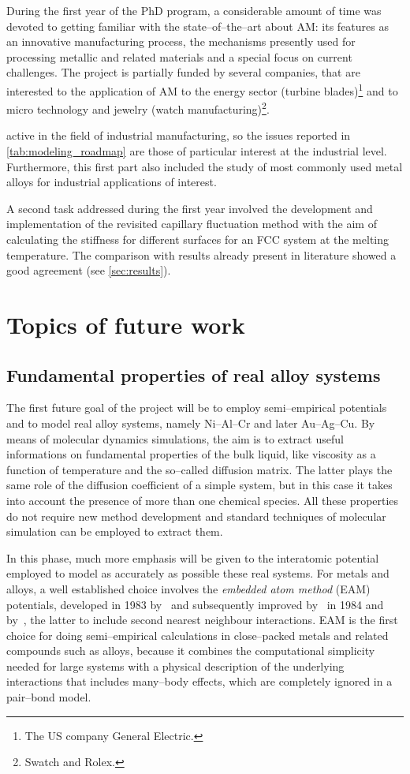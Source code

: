 During the first year of the PhD program, a considerable amount of time was devoted to getting familiar with the state--of--the--art about AM: its features as an innovative manufacturing process, the mechanisms presently used for processing metallic and related materials and a special focus on current challenges. The project is partially funded by several companies, that are interested to the application of AM to the energy sector (turbine blades)\footnote{The US company General Electric.} and to micro technology and jewelry (watch manufacturing)\footnote{Swatch and Rolex.}.

active in the field of industrial manufacturing, so the issues reported in \cref{tab:modeling_roadmap} are those of particular interest at the industrial level. Furthermore, this first part also included the study of most commonly used metal alloys for industrial applications of interest. 

A second task addressed during the first year involved the development and implementation of the revisited capillary fluctuation method with the aim of calculating the stiffness for different surfaces for an FCC system at the melting temperature. The comparison with results already present in literature showed a good agreement (see \cref{sec:results}).



\section{Topics of future work}

\subsection{Fundamental properties of real alloy systems}
The first future goal of the project will be to employ semi--empirical potentials and to model real alloy systems, namely Ni--Al--Cr and later Au--Ag--Cu. By means of molecular dynamics simulations, the aim is to extract useful informations on fundamental properties of the bulk liquid, like viscosity as a function of temperature and the so--called diffusion matrix. The latter plays the same role of the diffusion coefficient of a simple system, but in this case it takes into account the presence of more than one chemical species. All these properties do not require new method development and standard techniques of molecular simulation can be employed to extract them.

In this phase, much more emphasis will be given to the interatomic potential employed to model as accurately as possible these real systems. For metals and alloys, a well established choice involves the \textit{embedded atom method} (EAM) potentials, developed in 1983 by~\textcite{Daw1983EAM,Daw1984EAM} and subsequently improved by~\textcite{Finnis1984EAM} in 1984 and by~\textcite{Lee2000}, the latter to include second nearest neighbour interactions. EAM is the first choice for doing semi--empirical calculations in close--packed metals and related compounds such as alloys, because it combines the computational simplicity needed for large systems with a physical description of the underlying interactions that includes many--body effects, which are completely ignored in a pair--bond model.

